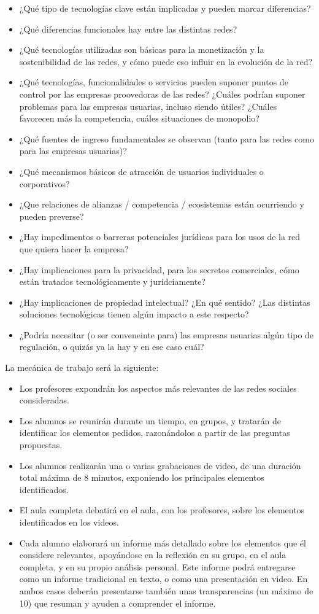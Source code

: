 \documentclass[a4paper,12pt]{article}
\begin{document}
\begin{itemize}
\item ¿Qué tipo de tecnologías clave están implicadas y pueden marcar diferencias?
\item ¿Qué diferencias funcionales hay entre las distintas redes?
\item ¿Qué tecnologías utilizadas son básicas para la monetización y la
sostenibilidad de las redes, y cómo puede eso influir en la evolución de la red?
\item ¿Qué tecnologías, funcionalidades o servicios pueden suponer puntos
de control por las empresas proovedoras de las redes? ¿Cuáles podrían suponer
problemas para las empresas usuarias, incluso siendo útiles? ¿Cuáles favorecen
más la competencia, cuáles situaciones de monopolio?
\item ¿Qué fuentes de ingreso fundamentales se observan (tanto para las redes como para las empresas usuarias)?
\item ¿Qué mecanismos básicos de atracción de usuarios individuales o corporativos?
\item ¿Que relaciones de alianzas / competencia / ecosistemas están
ocurriendo y pueden preverse?
\item ¿Hay impedimentos o barreras potenciales jurídicas para los usos de la red que quiera hacer la empresa?
\item ¿Hay implicaciones para la privacidad, para los secretos comerciales, cómo están tratados tecnológicamente y jurídciamente?
\item ¿Hay implicaciones de propiedad intelectual? ¿En qué sentido? ¿Las
distintas soluciones tecnológicas tienen algún impacto a este respecto?
\item ¿Podría necesitar (o ser conveneinte para) las empresas usuarias algún tipo de regulación, o quizás ya la hay y en ese caso cuál?
\end{itemize}

La mecánica de trabajo será la siguiente:

\begin{itemize}
\item Los profesores expondrán los aspectos más relevantes de las redes sociales consideradas.
\item Los alumnos se reunirán durante un tiempo, en grupos, y tratarán de identificar los elementos pedidos, razonándolos a partir de las preguntas propuestas.
\item Los alumnos realizarán una o varias grabaciones de video, de una duración total máxima de 8 minutos, exponiendo los principales elementos identificados.
\item El aula completa debatirá en el aula, con los profesores, sobre los elementos identificados en los videos.
\item Cada alumno elaborará un informe más detallado sobre los elementos que él considere relevantes, apoyándose en la reflexión en su grupo, en el aula completa, y en su propio análisis personal. Este informe podrá entregarse como un informe tradicional en texto, o como una presentación en video. En ambos casos deberán presentarse también unas transparencias (un máximo de 10) que resuman y ayuden a comprender el informe.
\end{itemize}
\end{document}
